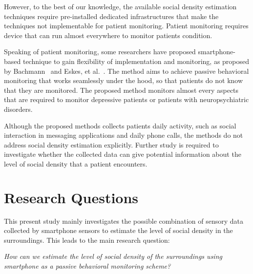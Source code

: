 However, to the best of our knowledge, the available social density estimation techniques require pre-installed dedicated infrastructures that make the techniques not implementable for patient monitoring. Patient monitoring requires device that can run almost everywhere to monitor patients condition.

Speaking of patient monitoring, some researchers have proposed smartphone-based technique to gain flexibility of implementation and monitoring, as proposed by Bachmann~\cite{thesis031} and Eskes, et al.~\cite{thesis015}. The method aims to achieve passive behavioral monitoring that works seamlessly under the hood, so that patients do not know that they are monitored. The proposed method monitors almost every aspects that are required to monitor depressive patients or patients with neuropsychiatric disorders.

Although the proposed methods collects patients daily activity, such as social interaction in messaging applications and daily phone calls, the methods do not address social density estimation explicitly. Further study is required to investigate whether the collected data can give potential information about the level of social density that a patient encounters. 

\section{Research Questions} %
\label{sec:research_questions}
This present study mainly investigates the possible combination of sensory data collected by smartphone sensors to estimate the level of social density in the surroundings. 
This leads to the main research question:
\begin{displayquote}\textit{
How can we estimate the level of social density of the surroundings using smartphone as a passive behavioral monitoring scheme?}
\end{displayquote}

